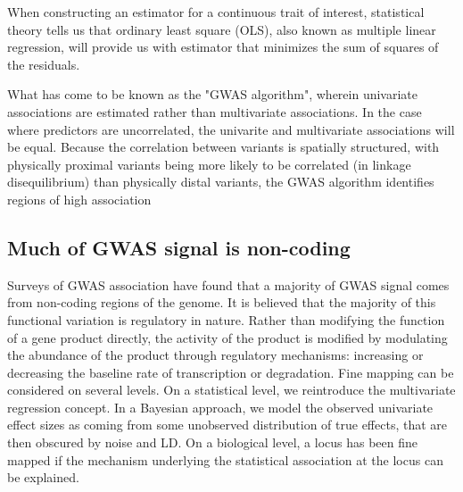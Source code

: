 






When constructing an estimator for a continuous trait of interest, statistical theory tells us that ordinary least square (OLS),
 also known as multiple linear regression, will provide us with estimator that minimizes the sum of squares of the residuals.

What has come to be known as the "GWAS algorithm", wherein univariate associations are estimated rather than multivariate associations.
In the case where predictors are uncorrelated, the univarite and multivariate associations will be equal.  Because the correlation between variants is 
spatially structured, with physically proximal variants being more likely to be correlated (in linkage disequilibrium) than physically distal variants, 
the GWAS algorithm identifies regions of high association


\subsection{Much of GWAS signal is non-coding}\label{sec:org3ac0b01}

Surveys of GWAS association have found that a majority of GWAS signal comes from non-coding regions of the genome.  It is believed that the majority 
of this functional variation is regulatory in nature.  Rather than modifying the function of a gene product directly, the activity of the product is modified
by modulating the abundance of the product through regulatory mechanisms: increasing or decreasing the baseline rate of transcription or degradation.  
Fine mapping can be considered on several levels.
On a statistical level, we reintroduce the multivariate regression concept.  In a Bayesian approach, we model the observed univariate effect sizes as coming from some
unobserved distribution of true effects, that are then obscured by noise and LD. On a biological level,
a locus has been fine mapped if the mechanism underlying the statistical association at the locus can be explained.




